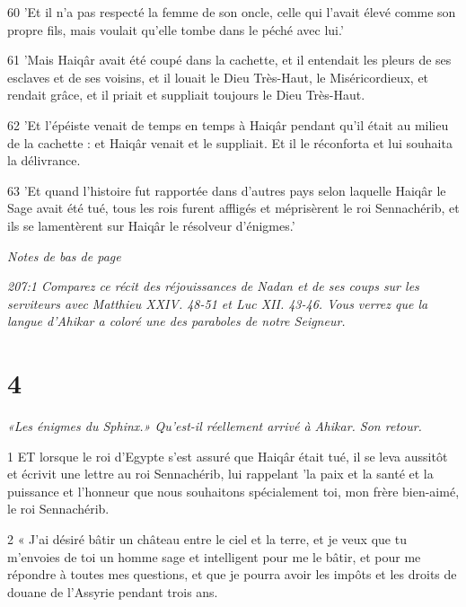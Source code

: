 \par 60 'Et il n'a pas respecté la femme de son oncle, celle qui l'avait élevé comme son propre fils, mais voulait qu'elle tombe dans le péché avec lui.'

\par 61 'Mais Haiqâr avait été coupé dans la cachette, et il entendait les pleurs de ses esclaves et de ses voisins, et il louait le Dieu Très-Haut, le Miséricordieux, et rendait grâce, et il priait et suppliait toujours le Dieu Très-Haut.

\par 62 'Et l'épéiste venait de temps en temps à Haiqâr pendant qu'il était au milieu de la cachette : et Haiqâr venait et le suppliait. Et il le réconforta et lui souhaita la délivrance.

\par 63 'Et quand l'histoire fut rapportée dans d'autres pays selon laquelle Haiqâr le Sage avait été tué, tous les rois furent affligés et méprisèrent le roi Sennachérib, et ils se lamentèrent sur Haiqâr le résolveur d'énigmes.'

\par \textit{Notes de bas de page}

\par \textit{207:1 Comparez ce récit des réjouissances de Nadan et de ses coups sur les serviteurs avec Matthieu XXIV. 48-51 et Luc XII. 43-46. Vous verrez que la langue d'Ahikar a coloré une des paraboles de notre Seigneur.}

\chapter{4}

\par \textit{«Les énigmes du Sphinx.» Qu'est-il réellement arrivé à Ahikar. Son retour.}

\par 1 ET lorsque le roi d'Egypte s'est assuré que Haiqâr était tué, il se leva aussitôt et écrivit une lettre au roi Sennachérib, lui rappelant 'la paix et la santé et la puissance et l'honneur que nous souhaitons spécialement toi, mon frère bien-aimé, le roi Sennachérib.

\par 2 « J'ai désiré bâtir un château entre le ciel et la terre, et je veux que tu m'envoies de toi un homme sage et intelligent pour me le bâtir, et pour me répondre à toutes mes questions, et que je pourra avoir les impôts et les droits de douane de l'Assyrie pendant trois ans.

